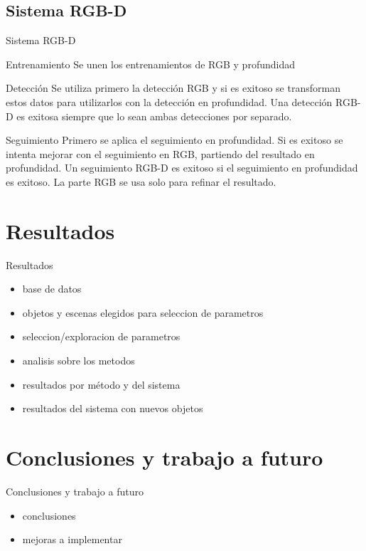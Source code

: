 \documentclass[]{beamer}
\begin{document}
\subsection{Sistema RGB-D}
\begin{frame}[t]{Sistema RGB-D}
    \begin{block}{Entrenamiento}
        Se unen los entrenamientos de RGB y profundidad
    \end{block}
    \begin{block}{Detección}
        Se utiliza primero la detección RGB y si es exitoso se transforman estos datos para utilizarlos con la detección en profundidad. Una detección RGB-D es exitosa siempre que lo sean ambas detecciones por separado.
    \end{block}
    \begin{block}{Seguimiento}
        Primero se aplica el seguimiento en profundidad. Si es exitoso se intenta mejorar con el seguimiento en RGB, partiendo del resultado en profundidad. Un seguimiento RGB-D es exitoso si el seguimiento en profundidad es exitoso. La parte RGB se usa solo para refinar el resultado.
    \end{block}
\end{frame}


\section{Resultados}
\begin{frame}{Resultados}
    \begin{itemize}
        \item base de datos
        \item objetos y escenas elegidos para seleccion de parametros
        \item seleccion/exploracion de parametros
        \item analisis sobre los metodos
        \item resultados por método y del sistema
        \item resultados del sistema con nuevos objetos
    \end{itemize}
\end{frame}


\section{Conclusiones y trabajo a futuro}
\begin{frame}{Conclusiones y trabajo a futuro}
    \begin{itemize}
        \item conclusiones
        \item mejoras a implementar
    \end{itemize}
\end{frame}
\end{document}
